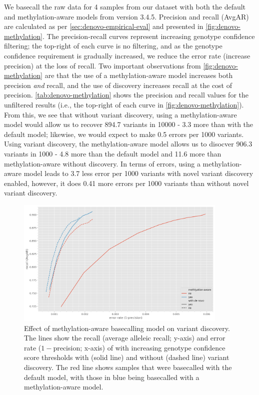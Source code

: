 We basecall the raw data for 4 samples from our dataset with both the default and methylation-aware models from \guppy{} version 3.4.5. Precision and recall (AvgAR) are calculated as per \autoref{sec:denovo-empirical-eval} and presented in \autoref{fig:denovo-methylation}. The precision-recall curves represent increasing genotype confidence filtering; the top-right of each curve is no filtering, and as the genotype confidence requirement is gradually increased, we reduce the error rate (increase precision) at the loss of recall. Two important observations from \autoref{fig:denovo-methylation} are that the use of a methylation-aware model increases both precision \emph{and} recall, and the use of \denovo{} discovery increases recall at the cost of precision. \autoref{tab:denovo-methylation} shows the precision and recall values for the unfiltered results (i.e., the top-right of each curve in \autoref{fig:denovo-methylation}). From this, we see that without \denovo{} variant discovery, using a methylation-aware model would allow us to recover 894.7 variants in 10000 - 3.3 more than with the default model; likewise, we would expect to make 0.5 errors per 1000 variants. Using \denovo{} variant discovery, the methylation-aware model allows us to disocver 906.3 variants in 1000 - 4.8 more than the default model and 11.6 more than methylation-aware without \denovo{} discovery. In terms of errors, using a methylation-aware model leads to 3.7 less error per 1000 variants with novel variant discovery enabled, however, it does 0.41 more errors per 1000 variants than without novel variant discovery. 

\begin{figure}
    \centering
    \includegraphics[width=0.9\textwidth]{Chapter1/Figs/pandora_basecaller_roc.png}
    \caption{Effect of \ont{} methylation-aware basecalling model on \pandora{} \denovo{} variant discovery. The lines show the recall (average alleleic recall; y-axis) and error rate ($1-$precision; x-axis) of \pandora{} with increasing genotype confidence score thresholds with (solid line) and without (dashed line) \denovo{} variant discovery. The red line shows samples that were basecalled with the default \guppy{} model, with those in blue being basecalled with a methylation-aware model.}
    \label{fig:denovo-methylation}
\end{figure}

